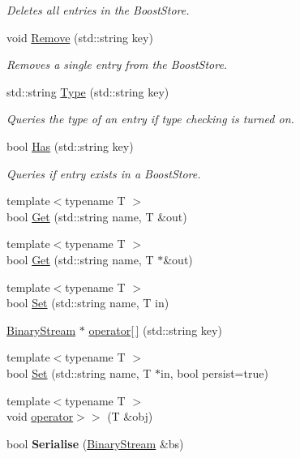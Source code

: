 \begin{DoxyCompactItemize}
\begin{DoxyCompactList}\small\item\em Deletes all entries in the Boost\-Store. \end{DoxyCompactList}\item 
void \hyperlink{classBStore_a6a8bfbede11adc57503efeca395dd5b4}{Remove} (std\-::string key)
\begin{DoxyCompactList}\small\item\em Removes a single entry from the Boost\-Store. \end{DoxyCompactList}\item 
std\-::string \hyperlink{classBStore_a1a2e9beec6992ed4f7ef1c01c211c955}{Type} (std\-::string key)
\begin{DoxyCompactList}\small\item\em Queries the type of an entry if type checking is turned on. \end{DoxyCompactList}\item 
bool \hyperlink{classBStore_aee9b4f22889fc26c3f8f67b0bed3776d}{Has} (std\-::string key)
\begin{DoxyCompactList}\small\item\em Queries if entry exists in a Boost\-Store. \end{DoxyCompactList}\item 
{\footnotesize template$<$typename T $>$ }\\bool \hyperlink{classBStore_a42f6ced1ecba93e1ef648ce17245e4fe}{Get} (std\-::string name, T \&out)
\item 
{\footnotesize template$<$typename T $>$ }\\bool \hyperlink{classBStore_acede0b4514b44fe9c3e1cb1e09c359e1}{Get} (std\-::string name, T $\ast$\&out)
\item 
{\footnotesize template$<$typename T $>$ }\\bool \hyperlink{classBStore_a3013181605a91ea0676ca65c9b14e3c3}{Set} (std\-::string name, T in)
\item 
\hyperlink{classBinaryStream}{Binary\-Stream} $\ast$ \hyperlink{classBStore_adcea1522f4c8adcc92a04a825cb84c3d}{operator\mbox{[}$\,$\mbox{]}} (std\-::string key)
\item 
{\footnotesize template$<$typename T $>$ }\\bool \hyperlink{classBStore_a764ca4d945cb90ddd1bb422b46016769}{Set} (std\-::string name, T $\ast$in, bool persist=true)
\item 
{\footnotesize template$<$typename T $>$ }\\void \hyperlink{classBStore_a7594a567b2c3d718781efbb0f411888a}{operator$>$$>$} (T \&obj)
\item 
\hypertarget{classBStore_aad69a5bed1adbf77c47bff31b3509880}{bool {\bfseries Serialise} (\hyperlink{classBinaryStream}{Binary\-Stream} \&bs)}\label{classBStore_aad69a5bed1adbf77c47bff31b3509880}


\end{DoxyCompactItemize}
